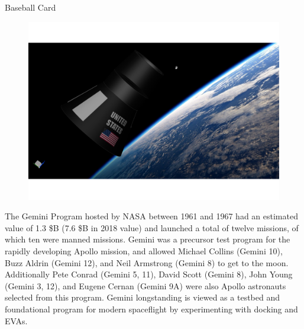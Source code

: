 \documentclass[10pt]{beamer}
\begin{document}
	\begin{frame}{Baseball Card}
		\begin{minipage}{0.48\textwidth}
\begin{figure}[H]
	\centering
	\includegraphics[width=\textwidth]{CapsuleOpaque.png}
\end{figure}
\tiny{The Gemini Program hosted by NASA between 1961 and 1967 had an estimated value of 1.3 \$B (7.6 \$B in 2018 value) and launched a total of twelve missions, of which ten were manned missions. Gemini was a precursor test program for the rapidly developing Apollo mission, and allowed Michael Collins (Gemini 10), Buzz Aldrin (Gemini 12), and Neil Armstrong (Gemini 8) to get to the moon. Additionally Pete Conrad (Gemini 5, 11), David Scott (Gemini 8), John Young (Gemini 3, 12), and Eugene Cernan (Gemini 9A) were also Apollo astronauts selected from this program. Gemini longstanding is viewed as a testbed and foundational program for modern spaceflight by experimenting with docking and EVAs. }



\end{minipage}
\end{frame}
\end{document}
